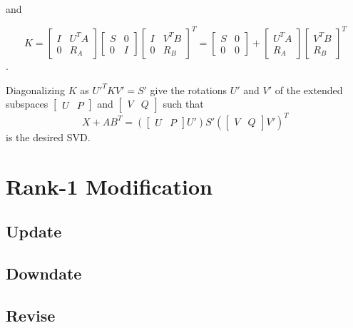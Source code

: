 \documentclass{article}
\begin{document}
and

$$
K=
\begin{bmatrix}
I & U^TA\\
0 & R_A
\end{bmatrix}
\begin{bmatrix}
S & 0\\
0 & I
\end{bmatrix}
\begin{bmatrix}
I & V^TB\\
0 & R_B
\end{bmatrix}^T
=
\begin{bmatrix}
S & 0\\
0 & 0
\end{bmatrix}
+
\begin{bmatrix}
U^TA\\
R_A
\end{bmatrix}
\begin{bmatrix}
V^TB\\
R_B
\end{bmatrix}^T
$$.

Diagonalizing $K$ as $U'^TKV'=S'$ give the rotations $U'$ and $V'$ of the extended subspaces
$
\begin{bmatrix}
U & P
\end{bmatrix}
$
and
$
\begin{bmatrix}
V & Q
\end{bmatrix}
$
such that
$$
X+AB^T = \left(
\begin{bmatrix}
U & P
\end{bmatrix}
U' \right)
S'\left(
\begin{bmatrix}
V & Q
\end{bmatrix}
V'\right)^T
$$
is the desired SVD.


\section{Rank-1 Modification\label{Rank}}

\subsection{Update\label{Update}}
\subsection{Downdate\label{Downdate}}
\subsection{Revise\label{Revise}}
\end{document}
